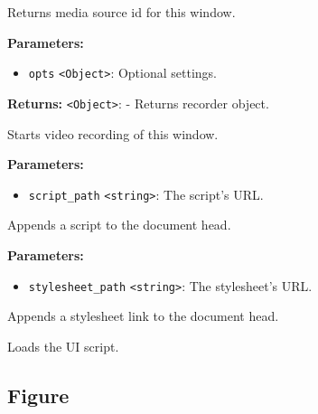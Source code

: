 \documentclass[12pt,a4paper]{article}
\begin{document}
\noindent Returns media source id for this window.

\vspace{5mm}
\noindent {}


\noindent \textbf{Parameters:}
\begin{itemize}
  \item \texttt{opts} \texttt{<Object>}: Optional settings.
\end{itemize}

\noindent \textbf{Returns:} \texttt{<Object>}: - Returns recorder object.

\noindent Starts video recording of this window.

\vspace{5mm}
\noindent {}


\noindent \textbf{Parameters:}
\begin{itemize}
  \item \texttt{script\_path} \texttt{<string>}: The script's URL.
\end{itemize}

\noindent Appends a script to the document head.

\vspace{5mm}
\noindent {}


\noindent \textbf{Parameters:}
\begin{itemize}
  \item \texttt{stylesheet\_path} \texttt{<string>}: The stylesheet's URL.
\end{itemize}

\noindent Appends a stylesheet link to the document head.

\vspace{5mm}
\noindent {}


\noindent Loads the UI script.


\subsection{Figure}
\vspace{5mm}
\noindent {}
\end{document}

